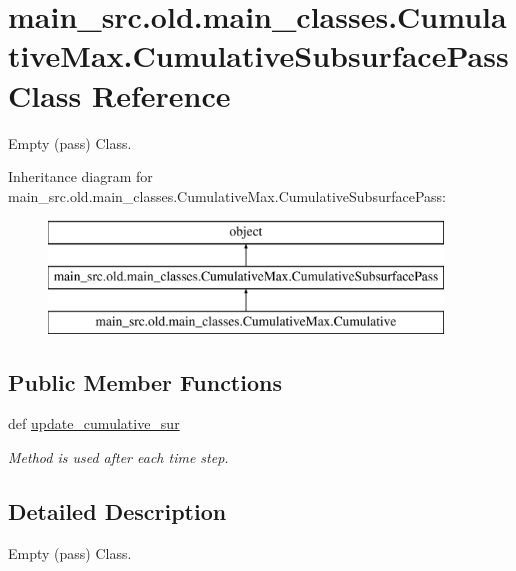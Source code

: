 \hypertarget{classmain__src_8old_1_1main__classes_1_1CumulativeMax_1_1CumulativeSubsurfacePass}{\section{main\-\_\-src.\-old.\-main\-\_\-classes.\-Cumulative\-Max.\-Cumulative\-Subsurface\-Pass Class Reference}
\label{classmain__src_8old_1_1main__classes_1_1CumulativeMax_1_1CumulativeSubsurfacePass}
}


Empty (pass) Class.  


Inheritance diagram for main\-\_\-src.\-old.\-main\-\_\-classes.\-Cumulative\-Max.\-Cumulative\-Subsurface\-Pass\-:\begin{figure}[H]
\begin{center}
\leavevmode
\includegraphics[height=3.000000cm]{classmain__src_8old_1_1main__classes_1_1CumulativeMax_1_1CumulativeSubsurfacePass}
\end{center}
\end{figure}
\subsection*{Public Member Functions}
\begin{DoxyCompactItemize}
\item 
def \hyperlink{classmain__src_8old_1_1main__classes_1_1CumulativeMax_1_1CumulativeSubsurfacePass_a8a7ddaaeb7b3f92288a0075a9ca74dc9}{update\-\_\-cumulative\-\_\-sur}
\begin{DoxyCompactList}\small\item\em Method is used after each time step. \end{DoxyCompactList}\end{DoxyCompactItemize}


\subsection{Detailed Description}
Empty (pass) Class. 

